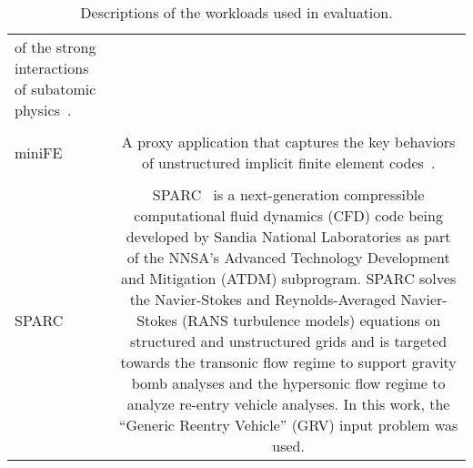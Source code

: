\begin{table*}[ht!]
\begin{tabular}{@{}lc@{}}
{{                              of the strong interactions of subatomic physics~\cite{MILC_web}.}}\\
  & \\
        miniFE & \parbox{\appDescWidth}{\tiny{A proxy application that captures the key behaviors of unstructured implicit
                                finite element codes~\cite{Heroux09Mantevo}.}}\\
  & \\
        SPARC & \parbox{\appDescWidth}{\tiny{SPARC~\cite{Howard:2017:Sparc} is a next-generation compressible
        computational fluid dynamics (CFD) code being developed by Sandia National Laboratories
        as part of the NNSA's Advanced Technology Development and Mitigation (ATDM) subprogram.
        SPARC solves the Navier-Stokes and Reynolds-Averaged Navier-Stokes (RANS turbulence models)
        equations on structured and unstructured grids and is targeted towards the transonic flow
        regime to support gravity bomb analyses and the hypersonic flow regime to analyze re-entry
        vehicle analyses. In this work, the ``Generic Reentry Vehicle'' (GRV) input problem was
        used.}}\\

\bottomrule
\end{tabular}
\caption{Descriptions of the workloads used in evaluation.}
\label{tab:app_desc}
\end{table*}


